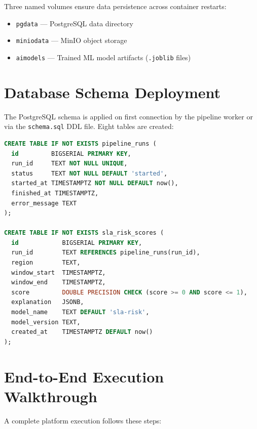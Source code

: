 Three named volumes ensure data persistence across container restarts:
\begin{itemize}
  \item \texttt{pgdata} --- PostgreSQL data directory
  \item \texttt{miniodata} --- MinIO object storage
  \item \texttt{aimodels} --- Trained ML model artifacts (\texttt{.joblib} files)
\end{itemize}

\section{Database Schema Deployment}

The PostgreSQL schema is applied on first connection by the pipeline worker or via the \texttt{schema.sql} DDL file. Eight tables are created:

\begin{lstlisting}[language=SQL, caption={Key schema definitions (excerpt).}]
CREATE TABLE IF NOT EXISTS pipeline_runs (
  id         BIGSERIAL PRIMARY KEY,
  run_id     TEXT NOT NULL UNIQUE,
  status     TEXT NOT NULL DEFAULT 'started',
  started_at TIMESTAMPTZ NOT NULL DEFAULT now(),
  finished_at TIMESTAMPTZ,
  error_message TEXT
);

CREATE TABLE IF NOT EXISTS sla_risk_scores (
  id            BIGSERIAL PRIMARY KEY,
  run_id        TEXT REFERENCES pipeline_runs(run_id),
  region        TEXT,
  window_start  TIMESTAMPTZ,
  window_end    TIMESTAMPTZ,
  score         DOUBLE PRECISION CHECK (score >= 0 AND score <= 1),
  explanation   JSONB,
  model_name    TEXT DEFAULT 'sla-risk',
  model_version TEXT,
  created_at    TIMESTAMPTZ DEFAULT now()
);
\end{lstlisting}

\section{End-to-End Execution Walkthrough}

A complete platform execution follows these steps:

